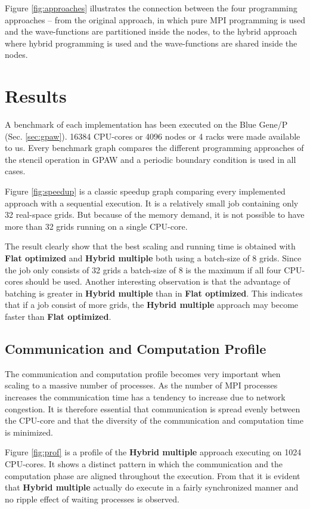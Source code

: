\documentclass[preprint,3p,times,twocolumn]{elsarticle}
\begin{document}
Figure \ref{fig:approaches} illustrates the connection between the four programming approaches -- from the original approach, in which pure MPI programming is used and the wave-functions are partitioned inside the nodes, to the hybrid approach where hybrid programming is used and the wave-functions are shared inside the nodes.


\section{Results}
A benchmark of each implementation has been executed on the Blue Gene/P (Sec. \ref{sec:gpaw}). 16384 CPU-cores or 4096 nodes or 4 racks were made available to us. Every benchmark graph compares the different programming approaches of the stencil operation in GPAW and a periodic boundary condition is used in all cases.

Figure \ref{fig:speedup} is a classic speedup graph comparing every implemented approach with a sequential execution. It is a relatively small job containing only 32 real-space grids. But because of the memory demand, it is not possible to have more than 32 grids running on a single CPU-core.

The result clearly show that the best scaling and running time is obtained with \textbf{Flat optimized} and \textbf{Hybrid multiple} both using a batch-size of 8 grids. Since the job only consists of 32 grids a batch-size of 8 is the maximum if all four CPU-cores should be used. Another interesting observation is that the advantage of batching is greater in \textbf{Hybrid multiple} than in \textbf{Flat optimized}. This indicates that if a job consist of more grids, the \textbf{Hybrid multiple} approach may become faster than \textbf{Flat optimized}.

\subsection{Communication and Computation Profile}
The communication and computation profile becomes very important when scaling to a massive number of processes. As the number of MPI processes increases the communication time has a tendency to increase due to network congestion. It is therefore essential that communication is spread evenly between the CPU-core and that the diversity of the communication and computation time is minimized. 

Figure \ref{fig:prof} is a profile of the \textbf{Hybrid multiple} approach executing on 1024 CPU-cores. It shows a distinct pattern in which the communication and the computation phase are aligned throughout the execution. From that it is evident that \textbf{Hybrid multiple} actually do execute in a fairly synchronized manner and no ripple effect of waiting processes is observed.
\end{document}
